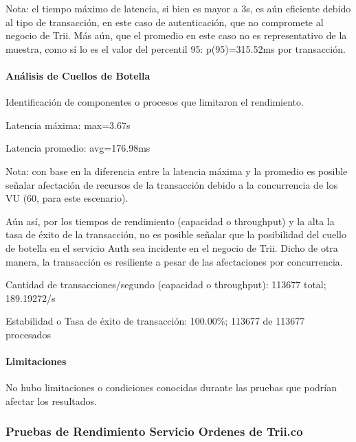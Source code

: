 \documentclass[
  paper=a4,
  ,captions=tableheading
]{scrartcl}
\renewenvironment{quote}{\begin{customblockquote}\list{}{\rightmargin=0em\leftmargin=0em}%
\item\relax\color{blockquote-text}\ignorespaces}{\unskip\unskip\endlist\end{customblockquote}}
\begin{document}
Nota: el tiempo máximo de latencia, si bien es mayor a 3s, es aún
eficiente debido al tipo de transacción, en este caso de autenticación,
que no compromete al negocio de Trii. Más aún, que el promedio en este
caso no es representativo de la muestra, como sí lo es el valor del
percentil 95: p(95)=315.52ms por transacción.

\paragraph{Análisis de Cuellos de
Botella}\label{sec:anuxe1lisis-de-cuellos-de-botella-1}

Identificación de componentes o procesos que limitaron el rendimiento.

\begin{quote}
Latencia máxima: max=3.67s

Latencia promedio: avg=176.98ms
\end{quote}

Nota: con base en la diferencia entre la latencia máxima y la promedio
es posible señalar afectación de recursos de la transacción debido a la
concurrencia de los VU (60, para este escenario).

Aún así, por los tiempos de rendimiento (capacidad o throughput) y la
alta la tasa de éxito de la transacción, no es posible señalar que la
posibilidad del cuello de botella en el servicio Auth sea incidente en
el negocio de Trii. Dicho de otra manera, la transacción es resiliente a
pesar de las afectaciones por concurrencia.

\begin{quote}
Cantidad de transacciones/segundo (capacidad o throughput): 113677
total; 189.19272/s

Estabilidad o Tasa de éxito de transacción: 100.00\%; 113677 de 113677
procesados
\end{quote}

\paragraph{Limitaciones}\label{sec:limitaciones-1}

\begin{quote}
No hubo limitaciones o condiciones conocidas durante las pruebas que
podrían afectar los resultados.
\end{quote}

\subsubsection{Pruebas de Rendimiento Servicio Ordenes de
Trii.co}\label{sec:pruebas-de-rendimiento-servicio-ordenes-de-trii.co}
\end{document}
